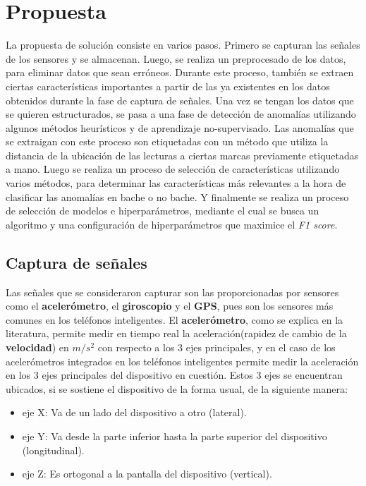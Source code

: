 \chapter{Propuesta}\label{chapter:proposal}
	La propuesta de solución consiste en varios pasos. Primero se capturan las señales de los sensores y se almacenan.
	Luego, se realiza un preprocesado de los datos, para eliminar datos que sean erróneos. Durante este proceso, también
	se extraen ciertas características importantes a partir de las ya existentes en los datos obtenidos durante la fase
	de captura de señales. Una vez se tengan los datos que se quieren estructurados, se pasa a una fase de detección de
	anomalías utilizando algunos métodos heurísticos y de aprendizaje no-supervisado. Las anomalías que se extraigan con
	este proceso son etiquetadas con un método que utiliza la distancia de la ubicación de las lecturas a ciertas marcas
	previamente etiquetadas a mano. Luego se realiza un proceso de selección de características utilizando varios métodos, 
	para determinar las características más relevantes a la hora de clasificar las anomalías en bache o no bache. Y
	finalmente se realiza un proceso de selección de modelos e hiperparámetros, mediante el cual se busca un algoritmo
	y una configuración de hiperparámetros que maximice el \emph{F1 score}.

\section{Captura de señales}
	Las señales que se consideraron capturar son las proporcionadas por sensores como el \textbf{acelerómetro},
	el \textbf{giroscopio} y el \textbf{GPS}, pues son los sensores más comunes en los teléfonos inteligentes. El
	\textbf{acelerómetro}, como se explica en la literatura, permite medir en tiempo real la aceleración(rapidez de
	cambio de la \textbf{velocidad}) en $m/s^2$ con respecto a los 3 ejes principales, y en el caso de los
	acelerómetros integrados en los teléfonos inteligentes permite medir la aceleración en los 3 ejes
	principales del dispositivo en cuestión. Estos 3 ejes se encuentran ubicados, si se sostiene el
	dispositivo de la forma usual, de la siguiente manera:

	\begin{itemize}
		\item eje X: Va de un lado del dispositivo a otro (lateral).
		\item eje Y: Va desde la parte inferior hasta la parte superior del dispositivo (longitudinal).
		\item eje Z: Es ortogonal a la pantalla del dispositivo (vertical).
	\end{itemize}
	

